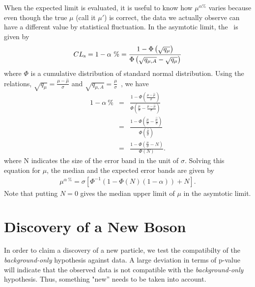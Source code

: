 When the expected limit is evaluated,  
it is useful to know how $\mu^{\alpha \%}$ varies 
because even though the true $\mu$ (call it $\mu'$) is correct, 
the data we actually observe can have a different value by statistical fluctuation.  
In the asymtotic limit, the \CLs\ is given by~\cite{combination_stat}
\begin{eqnarray} 
CL_\mathrm{s} 
= 1 - \alpha~\% 
= \frac{1 - \Phi\left(\sqrt{q_\mu}\right)}{\Phi\left(\sqrt{q_{\mu,A}} - \sqrt{q_\mu}\right)}   
\end{eqnarray} 
where $\Phi$ is a cumulative distribution of standard normal distribution. 
Using the relations, $\sqrt{q_\mu} = \frac{\mu - \hat{\mu}}{\sigma}$   
and $\sqrt{q_{\mu,A}} = \frac{\mu}{\sigma}$~\cite{cowan_asimov}, 
we have 
\begin{eqnarray} 
1 - \alpha~\% 
&=&   
\frac{1 - \Phi\left(\frac{\mu - \hat{\mu}}{\sigma} \right)}
       {\Phi\left( \frac{\mu}{\sigma} - \frac{\mu - \hat{\mu}}{\sigma} \right)} \\    
&=&   
\frac{1 - \Phi\left(\frac{\mu}{\sigma} - \frac{\hat{\mu}}{\sigma} \right)}
     {\Phi\left( \frac{\hat{\mu}}{\sigma} \right)} \\    
&=&   
\frac{1 - \Phi\left(\frac{\mu}{\sigma} - N \right)}
     {\Phi\left( N \right)}.    
\end{eqnarray}
where N indicates the size of the error band in the unit of $\sigma$.
Solving this equation for $\mu$, the median and the expected error bands are given by 
\begin{eqnarray} 
\mu^{\alpha~\%} 
= 
\sigma \left[ \Phi^{-1} \left( 1 - \Phi\left( N \right) 
\left( 1 - \alpha \right)  \right) + N \right].
\end{eqnarray} 
Note that putting $N=0$ gives the median upper limit of $\mu$ 
in the asymtotic limit. 



\section{Discovery of a New Boson}
\label{sec:stat_significance}

In order to claim a discovery of a new particle, we test the compatibilty of 
the \textit{background-only} hypothesis against data. A large deviation in 
terms of p-value will indicate that the observed data is not compatible 
with the \textit{background-only} hypothesis. 
Thus, something "new'' needs to be taken into account. 


